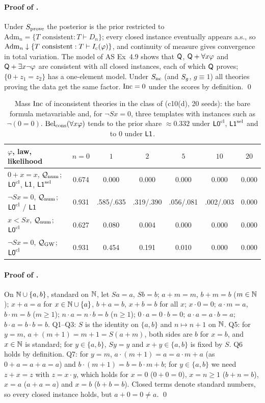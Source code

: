 \paragraph{Proof of .} Under $S_{\mathrm{prove}}$ the posterior is the prior restricted to $\mathrm{Adm}_n=\{T\text{ consistent}:T\vdash D_n\}$; every closed instance eventually appears a.s., so $\mathrm{Adm}_n\downarrow\{T\text{ consistent}:T\vdash I_{\mathrm{c}}(\varphi)\}$, and continuity of measure gives convergence in total variation. The model of AS Ex~4.9 shows that $\mathsf{Q}$, $\mathsf{Q}+\forall x\varphi$ and $\mathsf{Q}+\exists x\neg\varphi$ are consistent with all closed instances, each of which $\mathsf{Q}$ proves; $\{0+z_1=z_2\}$ has a one-element model. Under $S_{\mathrm{nc}}$ (and $S_{g}$, $g\equiv1$) all theories proving the data get the same factor. $\mathrm{Inc}=0$ under the scores by definition. \qed

\begin{table}[ht]
\centering\small
\begin{tabular}{@{}lcccccc@{}}
\toprule
$\varphi$, law, likelihood & $n=0$ & $1$ & $2$ & $5$ & $10$ & $20$\\
\midrule
$0+x=x$, $\mathcal{Q}_{\mathrm{num}}$; $\mathord{\mathsf{L0}}^{\mathrm{cl}}$, $\mathord{\mathsf{L1}}$, $\mathord{\mathsf{L1}}^{\mathrm{sel}}$ & 0.674 & 0.000 & 0.000 & 0.000 & 0.000 & 0.000\\
$\neg Sx=0$, $\mathcal{Q}_{\mathrm{num}}$; $\mathord{\mathsf{L0}}^{\mathrm{cl}}$ / $\mathord{\mathsf{L1}}$ & 0.931 & .585/.635 & .319/.390 & .056/.081 & .002/.003 & 0.000\\
$x<Sx$, $\mathcal{Q}_{\mathrm{num}}$; $\mathord{\mathsf{L0}}^{\mathrm{cl}}$ & 0.627 & 0.080 & 0.004 & 0.000 & 0.000 & 0.000\\
$\neg Sx=0$, $\mathcal{Q}_{\mathrm{GW}}$; $\mathord{\mathsf{L0}}^{\mathrm{cl}}$ & 0.931 & 0.454 & 0.191 & 0.010 & 0.000 & 0.000\\
\bottomrule
\end{tabular}
\caption{Mass $\mathrm{Inc}$ of inconsistent theories in the class of  (c10(d), 20 seeds): the bare formula metavariable and, for $\neg Sx=0$, three templates with instances such as $\neg(0=0)$. $\mathrm{Bel}_{\mathrm{cons}}(\forall x\varphi)$ tends to the prior share $\approx0.332$ under $\mathord{\mathsf{L0}}^{\mathrm{cl}}$, $\mathord{\mathsf{L1}}^{\mathrm{sel}}$ and to $0$ under $\mathord{\mathsf{L1}}$.}
\label{tab:univ:inc}
\end{table}

\paragraph{Proof of .} On $\mathbb{N}\cup\{a,b\}$, standard on $\mathbb{N}$, let $Sa=a$, $Sb=b$; $a+m=m$, $b+m=b$ ($m\in\mathbb{N}$); $x+a=a$ for $x\in\mathbb{N}\cup\{a\}$, $b+a=b$, $x+b=b$ for all $x$; $x\cdot0=0$; $a\cdot m=a$, $b\cdot m=b$ ($m\ge1$); $n\cdot a=n\cdot b=b$ ($n\ge1$); $0\cdot a=0\cdot b=0$; $a\cdot a=a\cdot b=a$; $b\cdot a=b\cdot b=b$. Q1--Q3: $S$ is the identity on $\{a,b\}$ and $n\mapsto n+1$ on $\mathbb{N}$. Q5: for $y=m$, $a+(m+1)=m+1=S(a+m)$, both sides are $b$ for $x=b$, and $x\in\mathbb{N}$ is standard; for $y\in\{a,b\}$, $Sy=y$ and $x+y\in\{a,b\}$ is fixed by $S$. Q6 holds by definition. Q7: for $y=m$, $a\cdot(m+1)=a=a\cdot m+a$ (as $0+a=a+a=a$) and $b\cdot(m+1)=b=b\cdot m+b$; for $y\in\{a,b\}$ we need $z+x=z$ with $z=x\cdot y$, which holds for $x=0$ ($0+0=0$), $x=n\ge1$ ($b+n=b$), $x=a$ ($a+a=a$) and $x=b$ ($b+b=b$). Closed terms denote standard numbers, so every closed instance holds, but $a+0=0\neq a$. \qed

